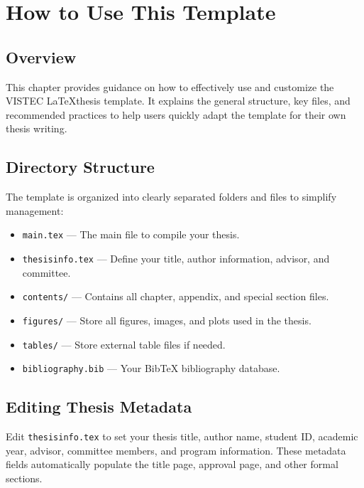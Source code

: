 \chapter{How to Use This Template}
\label{chapter2}

\section{Overview}
\begin{paragraph}
This chapter provides guidance on how to effectively use and customize the VISTEC \LaTeX thesis template. It explains the general structure, key files, and recommended practices to help users quickly adapt the template for their own thesis writing.
\end{paragraph}

\section{Directory Structure}
\begin{paragraph}
The template is organized into clearly separated folders and files to simplify management:

\begin{itemize}[leftmargin=\paritemindent]
    \item \texttt{main.tex} — The main file to compile your thesis.
    \item \texttt{thesisinfo.tex} — Define your title, author information, advisor, and committee.
    \item \texttt{contents/} — Contains all chapter, appendix, and special section files.
    \item \texttt{figures/} — Store all figures, images, and plots used in the thesis.
    \item \texttt{tables/} — Store external table files if needed.
    \item \texttt{bibliography.bib} — Your BibTeX bibliography database.
\end{itemize}
\end{paragraph}

\section{Editing Thesis Metadata}
\begin{paragraph}
Edit \texttt{thesisinfo.tex} to set your thesis title, author name, student ID, academic year, advisor, committee members, and program information. These metadata fields automatically populate the title page, approval page, and other formal sections.
\end{paragraph}

